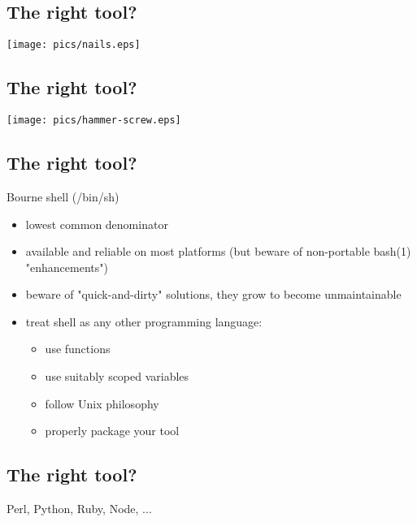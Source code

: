 \documentclass[xga]{xdvislides}
\begin{document}
\subsection{The right tool?}
\vspace*{\fill}
\begin{center}
	\texttt{[image: pics/nails.eps]}
\end{center}
\vspace*{\fill}

\subsection{The right tool?}
\vspace*{\fill}
\begin{center}
	\texttt{[image: pics/hammer-screw.eps]}
\end{center}
\vspace*{\fill}

\subsection{The right tool?}
Bourne shell (/bin/sh) \\

\begin{itemize}
	\item lowest common denominator
	\item available and reliable on most platforms (but beware of non-portable
		bash(1) "enhancements")
	\item beware of "quick-and-dirty" solutions, they grow to become
		unmaintainable
	\item treat shell as any other programming language:
		\begin{itemize}
			\item use functions
			\item use suitably scoped variables
			\item follow Unix philosophy
			\item properly package your tool
		\end{itemize}
\end{itemize}


\subsection{The right tool?}
Perl, Python, Ruby, Node, ... \\
\end{document}
